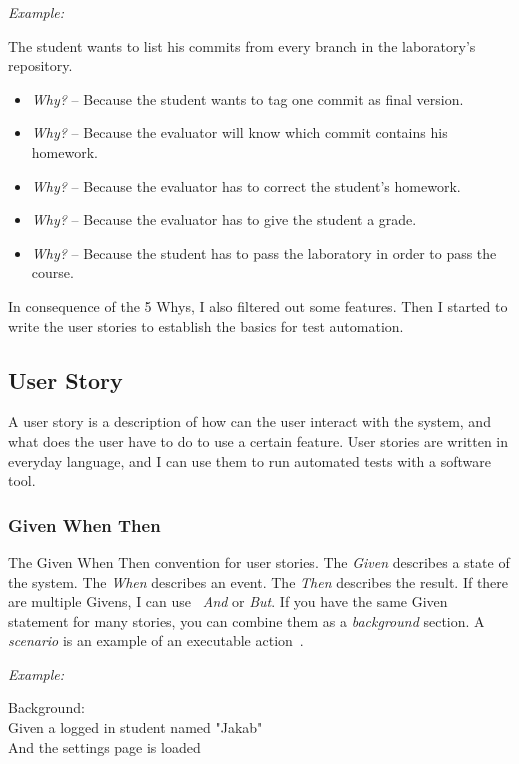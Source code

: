 \emph{Example:}

The student wants to list his commits from every branch in the laboratory's repository.
\begin{itemize}
	\item \emph{Why?} -- Because the student wants to tag one commit as final version.
	\item \emph{Why?} -- Because the evaluator will know which commit contains his homework.
	\item \emph{Why?} -- Because the evaluator has to correct the student's homework.
	\item \emph{Why?} -- Because the evaluator has to give the student a grade.
	\item \emph{Why?} -- Because the student has to pass the laboratory in order to pass the course.
\end{itemize}

In consequence of the 5 Whys, I also filtered out some features. Then I started to write the user stories to establish the basics for test automation.

\subsection{User Story}
A user story is a description of how can the user interact with the system, and what does the user have to do to use a certain feature. User stories are written in everyday language, and I can use them to run automated tests with a software tool. 

\subsubsection{Given When Then}

The Given When Then convention for user stories. The \emph{Given} describes a state of the system. The \emph{When} describes an event. The \emph{Then} describes the result. If there are multiple Givens, I can use ~\emph{And} or \emph{But}. If you have the same Given statement for many stories, you can combine them as a \emph{background} section. A \emph{scenario} is an example of an executable action~\cite{Cucumber-scenario}. 

\emph{Example:}

Background:\\ \hspace*{1cm}
Given a logged in student named "Jakab"\\ \hspace*{1cm}
And the settings page is loaded

